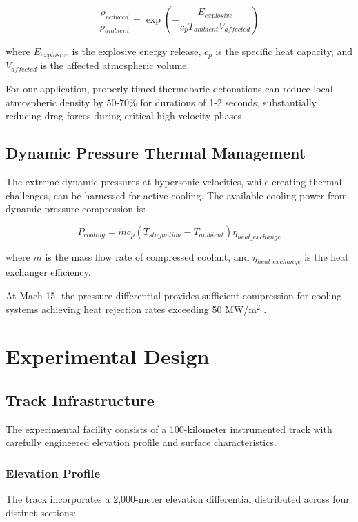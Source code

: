 \documentclass[12pt,a4paper]{article}
\begin{document}
\begin{equation}
\frac{\rho_{reduced}}{\rho_{ambient}} = \exp\left(-\frac{E_{explosive}}{c_p T_{ambient} V_{affected}}\right)
\label{eq:density_reduction}
\end{equation}

where $E_{explosive}$ is the explosive energy release, $c_p$ is the specific heat capacity, and $V_{affected}$ is the affected atmospheric volume.

For our application, properly timed thermobaric detonations can reduce local atmospheric density by 50-70\% for durations of 1-2 seconds, substantially reducing drag forces during critical high-velocity phases \cite{baker1983explosions}.

\subsection{Dynamic Pressure Thermal Management}

The extreme dynamic pressures at hypersonic velocities, while creating thermal challenges, can be harnessed for active cooling. The available cooling power from dynamic pressure compression is:

\begin{equation}
P_{cooling} = \dot{m} c_p (T_{stagnation} - T_{ambient}) \eta_{heat\_exchange}
\label{eq:cooling_power}
\end{equation}

where $\dot{m}$ is the mass flow rate of compressed coolant, and $\eta_{heat\_exchange}$ is the heat exchanger efficiency.

At Mach 15, the pressure differential provides sufficient compression for cooling systems achieving heat rejection rates exceeding 50 MW/m$^2$ \cite{heiser1994hypersonic}.

\section{Experimental Design}

\subsection{Track Infrastructure}

The experimental facility consists of a 100-kilometer instrumented track with carefully engineered elevation profile and surface characteristics.

\subsubsection{Elevation Profile}
The track incorporates a 2,000-meter elevation differential distributed across four distinct sections:
\end{document}
